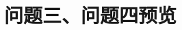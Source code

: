 \documentclass[withoutpreface,bwprint]{../cumcmthesis}
\begin{document}
\section{问题三、问题四预览}


\end{document}
